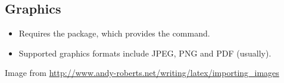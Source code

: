 \documentclass{beamer}
\begin{document}
\subsection{Graphics}
\begin{frame}[fragile]{\insertsubsection}
\begin{itemize}
\item Requires the  package, which provides the
 command.
\item Supported graphics formats include JPEG, PNG and PDF (usually).
\end{itemize}

\tiny{Image from \url{http://www.andy-roberts.net/writing/latex/importing_images}}
\end{frame}
\end{document}
